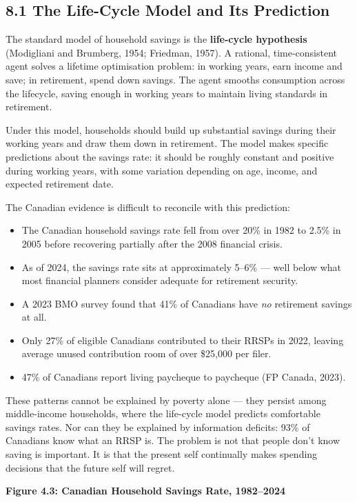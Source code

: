 \documentclass[12pt, letterpaper]{article}
\begin{document}
\subsection{8.1 The Life-Cycle Model and Its Prediction}


The standard model of household savings is the \textbf{life-cycle hypothesis} (Modigliani and Brumberg, 1954; Friedman, 1957). A rational, time-consistent agent solves a lifetime optimisation problem: in working years, earn income and save; in retirement, spend down savings. The agent smooths consumption across the lifecycle, saving enough in working years to maintain living standards in retirement.

Under this model, households should build up substantial savings during their working years and draw them down in retirement. The model makes specific predictions about the savings rate: it should be roughly constant and positive during working years, with some variation depending on age, income, and expected retirement date.

The Canadian evidence is difficult to reconcile with this prediction:
\begin{itemize}
\item The Canadian household savings rate fell from over 20\% in 1982 to 2.5\% in 2005 before recovering partially after the 2008 financial crisis.
\item As of 2024, the savings rate sits at approximately 5--6\% --- well below what most financial planners consider adequate for retirement security.
\item A 2023 BMO survey found that 41\% of Canadians have \textit{no} retirement savings at all.
\item Only 27\% of eligible Canadians contributed to their RRSPs in 2022, leaving average unused contribution room of over \$25,000 per filer.
\item 47\% of Canadians report living paycheque to paycheque (FP Canada, 2023).
\end{itemize}

These patterns cannot be explained by poverty alone --- they persist among middle-income households, where the life-cycle model predicts comfortable savings rates. Nor can they be explained by information deficits: 93\% of Canadians know what an RRSP is. The problem is not that people don't know saving is important. It is that the present self continually makes spending decisions that the future self will regret.

\textbf{Figure 4.3: Canadian Household Savings Rate, 1982--2024}
\end{document}
